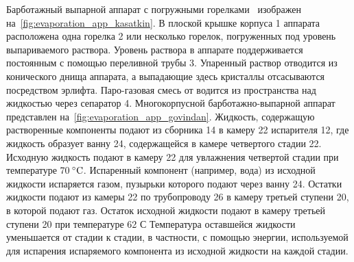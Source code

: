 Барботажный выпарной аппарат с погружными горелками~\cite{Kasatkin.Processi.1971} изображен на~\cref{fig:evaporation_app_kasatkin}.
В плоской крышке корпуса 1 аппарата расположена одна горелка 2 или несколько горелок, погруженных под уровень выпариваемого раствора.
Уровень раствора в аппарате поддерживается постоянным с помощью переливной трубы 3.
Упаренный раствор отводится из конического днища аппарата, а выпадающие здесь кристаллы отсасываются посредством эрлифта.
Паро-газовая смесь от водится из пространства над жидкостью через сепаратор 4.
Многокорпусной барботажно-выпарной аппарат \cite{Govindan.Multi.2015} представлен на~\cref{fig:evaporation_app_govindan}.
Жидкость, содержащую растворенные компоненты подают из сборника 14 в камеру 22 испарителя 12, где жидкость образует ванну 24, содержащейся в камере четвертого стадии 22.
Исходную жидкость подают в камеру 22 для увлажнения четвертой стадии при температуре 70\(\,^{\circ}\mathrm{C}\).
Испаренный компонент (например, вода) из исходной жидкости испаряется газом, пузырьки которого подают через ванну 24.
Остатки жидкости подают из камеры 22 по трубопроводу 26 в камеру третьей ступени 20, в которой подают газ.
Остаток исходной жидкости подают в камеру третьей ступени 20 при температуре 62 С
Температура оставшейся жидкости уменьшается от стадии к стадии, в частности, с помощью энергии, используемой для испарения испаряемого компонента из исходной жидкости на каждой стадии.

